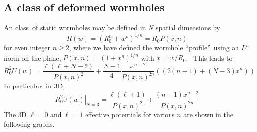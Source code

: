 \documentclass{article}%
\begin{document}
\subsection{A class of deformed wormholes}

An class\ of static wormholes may be defined in $N$ spatial dimensions by
\cite{CA et al.,AC}%
\begin{equation}
R\left(  w\right)  =\left(  R_{0}^{n}+w^{n}\right)  ^{1/n}=R_{0}P\left(
x,n\right)
\end{equation}
for even integer $n\geq2$, where we have defined the wormhole
\textquotedblleft profile\textquotedblright\ using an $L^{n}$ norm on the
plane, $P\left(  x,n\right)  =\left(  1+x^{n}\right)  ^{1/n}$ with $x=w/R_{0}%
$. \ This leads to%
\begin{equation}
R_{0}^{2}U\left(  w\right)  =\frac{\ell\left(  \ell+N-2\right)  }{P\left(
x,n\right)  ^{2}}+\frac{N-1}{4}\frac{x^{n-2}}{P\left(  x,n\right)  ^{2n}%
}\left(  \left(  2\left(  n-1\right)  +\left(  N-3\right)  x^{n}\right)
\right)
\end{equation}
In particular, in 3D,
\begin{equation}
\left.  R_{0}^{2}U\left(  w\right)  \right\vert _{N=3}=\frac{\ell\left(
\ell+1\right)  }{P\left(  x,n\right)  ^{2}}+\frac{\left(  n-1\right)  x^{n-2}%
}{P\left(  x,n\right)  ^{2n}}%
\end{equation}
The 3D $\ell=0$ and $\ell=1$ effective potentials for various $n$ are shown in
the following graphs.%
\end{document}
